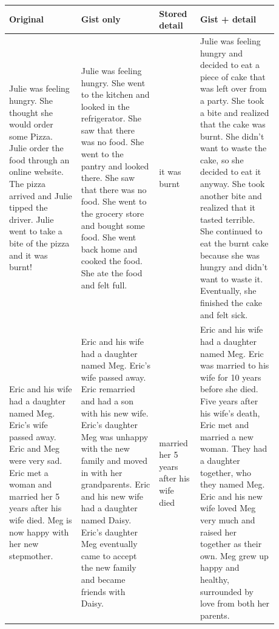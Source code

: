 \begin{table}[htp!]
\footnotesize
\centering
\begin{tabular}{|p{0.24\linewidth}|p{0.26\linewidth}|p{0.12\linewidth}|p{0.26\linewidth}|}
\hline
\textbf{Original} & \textbf{Gist only} & \textbf{Stored detail} & \textbf{Gist + detail} \\ \hline

Julie was feeling hungry. She thought she would order some Pizza. Julie order the food through an online website. The pizza arrived and Julie tipped the driver. Julie went to take a bite of the pizza and it was burnt!
& Julie was feeling hungry. She went to the kitchen and looked in the refrigerator. She saw that there was no food. She went to the pantry and looked there. She saw that there was no food. She went to the grocery store and bought some food. She went back home and cooked the food. She ate the food and felt full.
& it was burnt
& Julie was feeling hungry and decided to eat a piece of cake that was left over from a party. She took a bite and realized that the cake was burnt. She didn't want to waste the cake, so she decided to eat it anyway. She took another bite and realized that it tasted terrible. She continued to eat the burnt cake because she was hungry and didn't want to waste it. Eventually, she finished the cake and felt sick. \\ \hline

Eric and his wife had a daughter named Meg. Eric's wife passed away. Eric and Meg were very sad. Eric met a woman and married her 5 years after his wife died. Meg is now happy with her new stepmother.
& Eric and his wife had a daughter named Meg. Eric's wife passed away. Eric remarried and had a son with his new wife. Eric's daughter Meg was unhappy with the new family and moved in with her grandparents. Eric and his new wife had a daughter named Daisy. Eric's daughter Meg eventually came to accept the new family and became friends with Daisy.
& married her 5 years after his wife died
& Eric and his wife had a daughter named Meg. Eric was married to his wife for 10 years before she died. Five years after his wife's death, Eric met and married a new woman. They had a daughter together, who they named Meg. Eric and his new wife loved Meg very much and raised her together as their own. Meg grew up happy and healthy, surrounded by love from both her parents. \\ \hline


\end{tabular}
\end{table}
